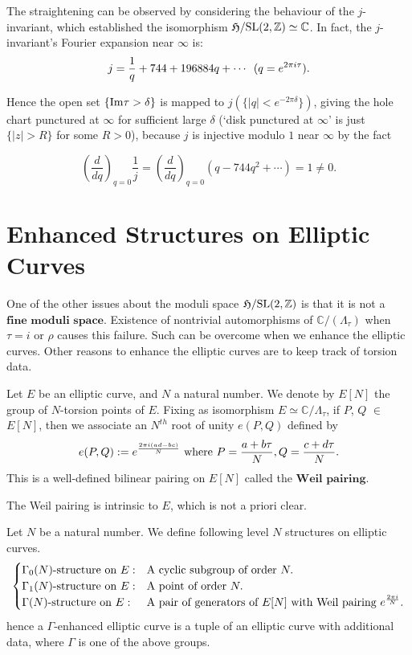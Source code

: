 \documentclass[a4paper,11pt]{article}
\begin{document}
The straightening can be observed by considering the behaviour of the $j$-invariant, which established the isomorphism $\mathfrak{H}/\textnormal{SL}(2,\mathbb{Z})\simeq\mathbb{C}$.
In fact, the $j$-invariant's Fourier expansion near $\infty$ is:
\[
j=\frac{1}{q}+744+196884q+\cdots \enskip (q=e^{2\pi i\tau}).
\]

Hence the open set $\{\textnormal{Im}\tau>\delta\}$ is mapped to $j(\{|q|<e^{-2\pi\delta}\})$, giving the hole chart punctured at $\infty$ for sufficient large $\delta$
(`disk punctured at $\infty$' is just $\{|z|>R\}$ for some $R>0$), because $j$ is injective modulo $1$ near $\infty$ by the fact

\[
\left(\frac{d}{dq}\right)_{q=0}\frac{1}{j}=\left(\frac{d}{dq}\right)_{q=0}(q-744q^2+\cdots)=1\neq0.
\]



\section{Enhanced Structures on Elliptic Curves}

One of the other issues about the moduli space $\mathfrak{H}/\textnormal{SL}(2,\mathbb{Z})$ is that it is not a $\textbf{fine moduli space}$.
Existence of nontrivial automorphisms of $\mathbb{C}/(\Lambda_{\tau})$ when $\tau=i$ or $\rho$ causes this failure.
Such can be overcome when we enhance the elliptic curves.
Other reasons to enhance the elliptic curves are to keep track of torsion data.


\begin{defn}
Let $E$ be an elliptic curve, and $N$ a natural number.
We denote by $E[N]$ the group of $N$-torsion points of $E$.
Fixing as isomorphism $E\simeq\mathbb{C}/\Lambda_{\tau}$, if $P$, $Q$ $\in$ $E[N]$, then we associate an $N^{th}$ root of unity $e(P,Q)$ defined by
\[
e(P,Q):=e^{\frac{2\pi i(ad-bc)}{N}} \textnormal{ where } P=\frac{a+b\tau}{N}, Q=\frac{c+d\tau}{N}.
\]
This is a well-defined bilinear pairing on $E[N]$ called the $\textbf{Weil pairing}$.
\end{defn}

The Weil pairing is intrinsic to $E$, which is not a priori clear.

\begin{defn}
Let $N$ be a natural number.
We define following level $N$ structures on elliptic curves.
\[
\begin{cases}
\Gamma_0(N)\textnormal{-structure on }E: & \textnormal{A cyclic subgroup of order }N.\\
\Gamma_1(N)\textnormal{-structure on }E: & \textnormal{A point of order }N.\\
\Gamma(N)\textnormal{-structure on }E: & \textnormal{A pair of generators of }E[N] \textnormal{ with Weil pairing } e^{\frac{2\pi i}{N}}.
\end{cases}
\]
hence a $\Gamma$-enhanced elliptic curve is a tuple of an elliptic curve with additional data, where $\Gamma$ is one of the above groups.
\end{defn}
\end{document}
